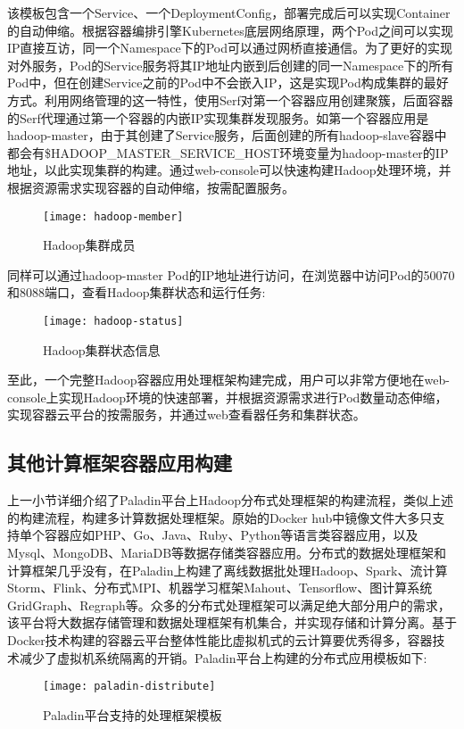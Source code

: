 该模板包含一个Service、一个DeploymentConfig，部署完成后可以实现Container的自动伸缩。根据容器编排引擎Kubernetes底层网络原理，两个Pod之间可以实现IP直接互访，同一个Namespace下的Pod可以通过网桥直接通信。为了更好的实现对外服务，Pod的Service服务将其IP地址内嵌到后创建的同一Namespace下的所有Pod中，但在创建Service之前的Pod中不会嵌入IP，这是实现Pod构成集群的最好方式。利用网络管理的这一特性，使用Serf对第一个容器应用创建聚簇，后面容器的Serf代理通过第一个容器的内嵌IP实现集群发现服务。如第一个容器应用是hadoop-master，由于其创建了Service服务，后面创建的所有hadoop-slave容器中都会有\$HADOOP\_MASTER\_SERVICE\_HOST环境变量为hadoop-master的IP地址，以此实现集群的构建。通过web-console可以快速构建Hadoop处理环境，并根据资源需求实现容器的自动伸缩，按需配置服务。
\begin{figure}[H] %
	\centering
	\texttt{[image: hadoop-member]}
	\caption{Hadoop集群成员}
\end{figure}

同样可以通过hadoop-master Pod的IP地址进行访问，在浏览器中访问Pod的50070和8088端口，查看Hadoop集群状态和运行任务:
\begin{figure}[H] %
	\centering
	\texttt{[image: hadoop-status]}
	\caption{Hadoop集群状态信息}
\end{figure}

至此，一个完整Hadoop容器应用处理框架构建完成，用户可以非常方便地在web-console上实现Hadoop环境的快速部署，并根据资源需求进行Pod数量动态伸缩，实现容器云平台的按需服务，并通过web查看器任务和集群状态。

\subsection{其他计算框架容器应用构建}
上一小节详细介绍了Paladin平台上Hadoop分布式处理框架的构建流程，类似上述的构建流程，构建多计算数据处理框架。原始的Docker hub中镜像文件大多只支持单个容器应如PHP、Go、Java、Ruby、Python等语言类容器应用，以及Mysql、MongoDB、MariaDB等数据存储类容器应用。分布式的数据处理框架和计算框架几乎没有，在Paladin上构建了离线数据批处理Hadoop、Spark、流计算Storm、Flink、分布式MPI、机器学习框架Mahout、Tensorflow、图计算系统GridGraph、Regraph等。众多的分布式处理框架可以满足绝大部分用户的需求，该平台将大数据存储管理和数据处理框架有机集合，并实现存储和计算分离。基于Docker技术构建的容器云平台整体性能比虚拟机式的云计算要优秀得多，容器技术减少了虚拟机系统隔离的开销。Paladin平台上构建的分布式应用模板如下:
\begin{figure}[H] %
	\centering
	\texttt{[image: paladin-distribute]}
	\caption{Paladin平台支持的处理框架模板}
\end{figure}

